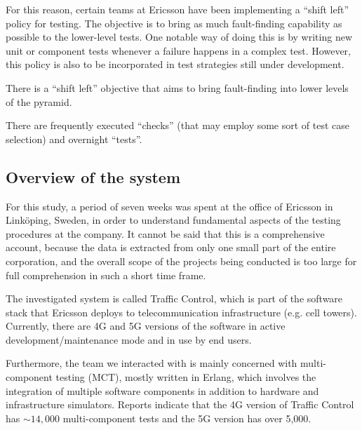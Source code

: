 For this reason, certain teams at Ericsson have been implementing a ``shift left'' policy for testing.
The objective is to bring as much fault-finding capability as possible to the lower-level tests.
One notable way of doing this is by writing new unit or component tests whenever a failure happens in a complex test.
However, this policy is also to be incorporated in test strategies still under development.



%


There is a ``shift left'' objective that aims to bring fault-finding into lower levels of the pyramid.

There are frequently executed ``checks'' (that may employ some sort of test case selection) and overnight ``tests''.


\subsection{Overview of the system}

For this study, a period of seven weeks was spent at the office of Ericsson in Linköping, Sweden, in order to understand fundamental aspects of the testing procedures at the company.
It cannot be said that this is a comprehensive account, because the data is extracted from only one small part of the entire corporation, and the overall scope of the projects being conducted is too large for full comprehension in such a short time frame.

The investigated system is called Traffic Control, which is part of the software stack that Ericsson deploys to telecommunication infrastructure (e.g. cell towers).
Currently, there are 4G and 5G versions of the software in active development/maintenance mode and in use by end users.

Furthermore, the team we interacted with is mainly concerned with multi-component testing (MCT), mostly written in Erlang, which involves the integration of multiple software components in addition to hardware and infrastructure simulators.
Reports indicate that the 4G version of Traffic Control has $\sim14,000$ multi-component tests and the 5G version has over 5,000.



%
%
%
